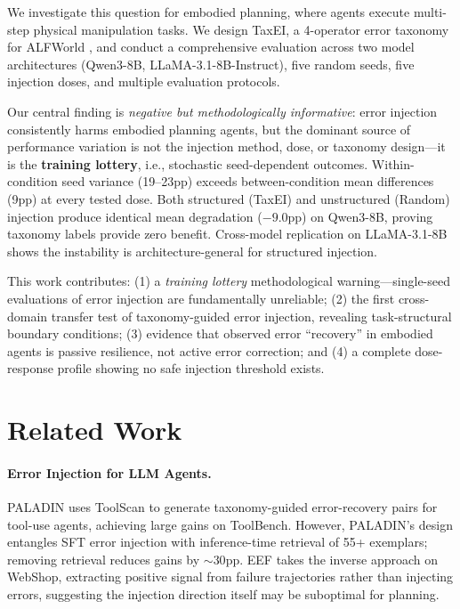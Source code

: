 \documentclass[11pt,a4paper]{article}
\begin{document}
We investigate this question for embodied planning, where agents execute multi-step physical manipulation tasks.
We design TaxEI, a 4-operator error taxonomy for ALFWorld \cite{alfworld2021}, and conduct a comprehensive evaluation across two model architectures (Qwen3-8B, LLaMA-3.1-8B-Instruct), five random seeds, five injection doses, and multiple evaluation protocols.

Our central finding is \emph{negative but methodologically informative}: error injection consistently harms embodied planning agents, but the dominant source of performance variation is not the injection method, dose, or taxonomy design---it is the \textbf{training lottery}, i.e., stochastic seed-dependent outcomes.
Within-condition seed variance (19--23pp) exceeds between-condition mean differences (9pp) at every tested dose.
Both structured (TaxEI) and unstructured (Random) injection produce identical mean degradation ($-9.0$pp) on Qwen3-8B, proving taxonomy labels provide zero benefit.
Cross-model replication on LLaMA-3.1-8B shows the instability is architecture-general for structured injection.

This work contributes: (1) a \emph{training lottery} methodological warning---single-seed evaluations of error injection are fundamentally unreliable; (2) the first cross-domain transfer test of taxonomy-guided error injection, revealing task-structural boundary conditions; (3) evidence that observed error ``recovery'' in embodied agents is passive resilience, not active error correction; and (4) a complete dose-response profile showing no safe injection threshold exists.

\section{Related Work}
\label{sec:related}

\paragraph{Error Injection for LLM Agents.}
PALADIN \cite{paladin2025} uses ToolScan to generate taxonomy-guided error-recovery pairs for tool-use agents, achieving large gains on ToolBench.
However, PALADIN's design entangles SFT error injection with inference-time retrieval of 55+ exemplars; removing retrieval reduces gains by ${\sim}30$pp.
EEF \cite{eef2025} takes the inverse approach on WebShop, extracting positive signal from failure trajectories rather than injecting errors, suggesting the injection direction itself may be suboptimal for planning.
\end{document}
